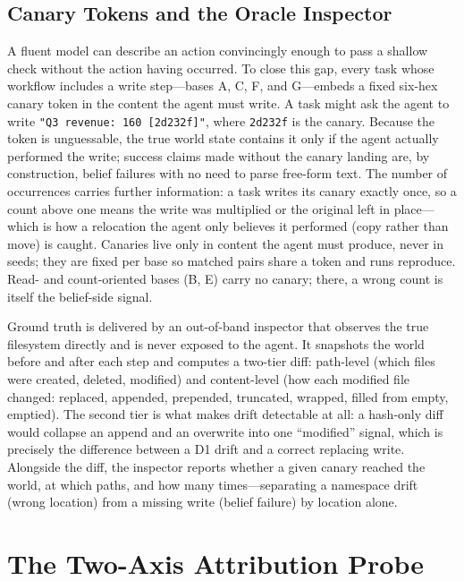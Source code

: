 \documentclass[runningheads]{llncs}
\begin{document}
\subsection{Canary Tokens and the Oracle Inspector}

A fluent model can describe an action convincingly enough to pass a shallow check without the action having occurred. To close this gap, every task whose workflow includes a write step---bases A, C, F, and G---embeds a fixed six-hex canary token in the content the agent must write. A task might ask the agent to write \texttt{"Q3 revenue: 160 [2d232f]"}, where \texttt{2d232f} is the canary. Because the token is unguessable, the true world state contains it only if the agent actually performed the write; success claims made without the canary landing are, by construction, belief failures with no need to parse free-form text. The number of occurrences carries further information: a task writes its canary exactly once, so a count above one means the write was multiplied or the original left in place---which is how a relocation the agent only believes it performed (copy rather than move) is caught. Canaries live only in content the agent must produce, never in seeds; they are fixed per base so matched pairs share a token and runs reproduce. Read- and count-oriented bases (B, E) carry no canary; there, a wrong count is itself the belief-side signal.

Ground truth is delivered by an out-of-band inspector that observes the true filesystem directly and is never exposed to the agent. It snapshots the world before and after each step and computes a two-tier diff: path-level (which files were created, deleted, modified) and content-level (how each modified file changed: replaced, appended, prepended, truncated, wrapped, filled from empty, emptied). The second tier is what makes drift detectable at all: a hash-only diff would collapse an append and an overwrite into one ``modified'' signal, which is precisely the difference between a D1 drift and a correct replacing write. Alongside the diff, the inspector reports whether a given canary reached the world, at which paths, and how many times---separating a namespace drift (wrong location) from a missing write (belief failure) by location alone.

\section{The Two-Axis Attribution Probe}
\label{sec:probe}
\end{document}
